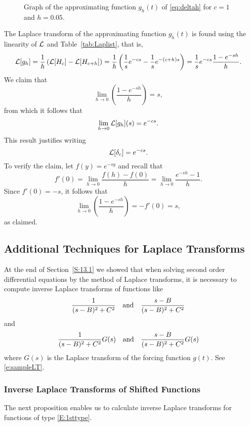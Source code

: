 \documentclass{ximera}
\begin{document}
\begin{figure}[htb]
           \centerline{%
           }
           \caption{Graph of the approximating function $g_h(t)$ of  
	   \protect\eqref{eq:deltah} for $c=1$ and $h=0.05$.}
           \label{fig:deltah}
\end{figure}

The Laplace transform of the approximating function $g_h(t)$ is found using 
the linearity of ${\cal L}$ and Table~\ref{tab:Laplist}, that is,
\[
{\cal L}[g_h] =  \frac{1}{h} \left({\cal L}[H_c]-{\cal L}[H_{c+h}]\right) =
\frac{1}{h}\left(\frac{1}{s}e^{-cs}-
\frac{1}{s}e^{-(c+h)s}\right) = \frac{1}{s}e^{-cs}\frac{1-e^{-sh}}{h}.
\]
We claim that
\[
\lim_{h\to 0} \left(\frac{1-e^{-sh}}{h}\right)=s,
\]
from which it follows that 
\[
\lim_{h\to 0} {\cal L}[g_h](s)=e^{-cs}.
\]
This result justifies writing
\begin{equation}  \label{e:lapdel}
{\cal L}[\delta_c] = e^{-cs}.
\end{equation}
To verify the claim, let $f(y)=e^{-sy}$ and recall that 
\[
f'(0) = \lim_{h\to 0} \frac{f(h)-f(0)}{h} =\lim_{h\to 0} \frac{e^{-sh}-1}{h}.
\]
Since $f'(0)=-s$, it follows that
\[
\lim_{h\to 0} \left(\frac{1-e^{-sh}}{h}\right)=-f'(0)=s,
\]
as claimed.


\subsection*{Additional Techniques for Laplace Transforms}

At the end of Section~\ref{S:13.1} we showed that when solving second order
differential equations by the method of Laplace transforms, it is necessary to 
compute inverse Laplace transforms of functions like
\begin{equation}  \label{E:1sttype}
\frac{1}{(s-B)^2+C^2} \quad\mbox{and}\quad \frac{s-B}{(s-B)^2+C^2}
\end{equation}
and 
\begin{equation}  \label{2ndtype}
\frac{1}{(s-B)^2+C^2}G(s) \quad\mbox{and}\quad \frac{s-B}{(s-B)^2+C^2}G(s)
\end{equation}
where $G(s)$ is the Laplace transform of the forcing function $g(t)$.
See \eqref{e:sampleLT}.  

\subsubsection*{Inverse Laplace Transforms of Shifted Functions}

The next proposition enables us to calculate inverse Laplace transforms for
functions of type \eqref{E:1sttype}.
\end{document}
